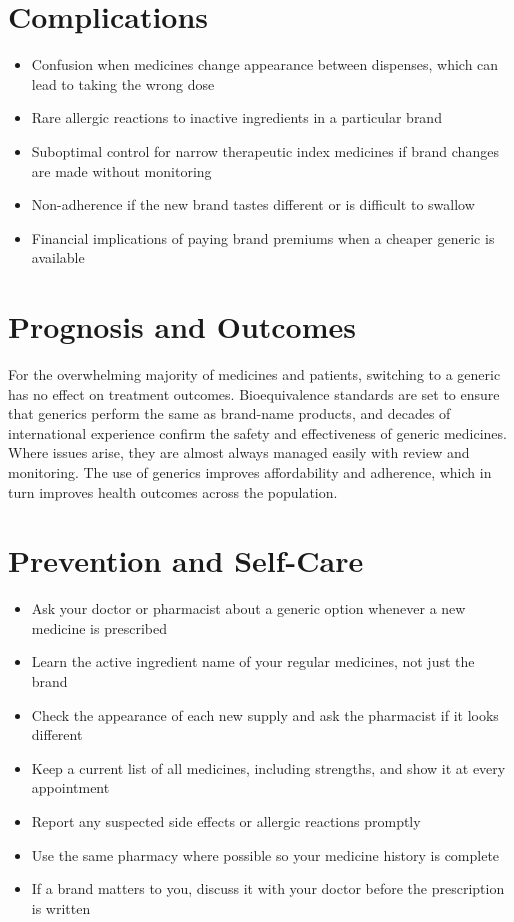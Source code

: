 \section*{Complications}
\begin{itemize}
    \item Confusion when medicines change appearance between dispenses, which can lead to taking the wrong dose
    \item Rare allergic reactions to inactive ingredients in a particular brand
    \item Suboptimal control for narrow therapeutic index medicines if brand changes are made without monitoring
    \item Non-adherence if the new brand tastes different or is difficult to swallow
    \item Financial implications of paying brand premiums when a cheaper generic is available
\end{itemize}

\section*{Prognosis and Outcomes}
For the overwhelming majority of medicines and patients, switching to a generic has no effect on treatment outcomes. Bioequivalence standards are set to ensure that generics perform the same as brand-name products, and decades of international experience confirm the safety and effectiveness of generic medicines. Where issues arise, they are almost always managed easily with review and monitoring. The use of generics improves affordability and adherence, which in turn improves health outcomes across the population.

\section*{Prevention and Self-Care}
\begin{itemize}
    \item Ask your doctor or pharmacist about a generic option whenever a new medicine is prescribed
    \item Learn the active ingredient name of your regular medicines, not just the brand
    \item Check the appearance of each new supply and ask the pharmacist if it looks different
    \item Keep a current list of all medicines, including strengths, and show it at every appointment
    \item Report any suspected side effects or allergic reactions promptly
    \item Use the same pharmacy where possible so your medicine history is complete
    \item If a brand matters to you, discuss it with your doctor before the prescription is written
\end{itemize}

